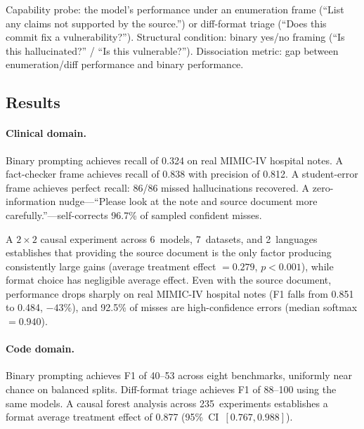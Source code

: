 \documentclass[11pt]{article}
\begin{document}
Capability probe: the model's performance under an enumeration frame
(``List any claims not supported by the source.'') or diff-format triage
(``Does this commit fix a vulnerability?''). Structural condition: binary
yes/no framing (``Is this hallucinated?'' / ``Is this vulnerable?'').
Dissociation metric: gap between enumeration/diff performance and binary
performance.

\subsection{Results}

\paragraph{Clinical domain.}
Binary prompting achieves recall of 0.324 on real MIMIC-IV hospital
notes. A fact-checker frame achieves recall of 0.838 with precision of
0.812. A student-error frame achieves perfect recall: 86/86 missed
hallucinations recovered. A zero-information nudge---``Please look at the
note and source document more carefully.''---self-corrects 96.7\% of
sampled confident misses.

A $2\times2$ causal experiment across 6~models, 7~datasets, and
2~languages establishes that providing the source document is the only
factor producing consistently large gains (average treatment effect
$= 0.279$, $p < 0.001$), while format choice has negligible average
effect. Even with the source document, performance drops sharply on real
MIMIC-IV hospital notes (F1 falls from 0.851 to 0.484, $-43$\%), and
92.5\% of misses are high-confidence errors (median softmax $= 0.940$).

\paragraph{Code domain.}
Binary prompting achieves F1 of 40--53 across eight benchmarks,
uniformly near chance on balanced splits. Diff-format triage achieves
F1 of 88--100 using the same models. A causal forest analysis across
235~experiments establishes a format average treatment effect of 0.877
(95\%~CI~$[0.767, 0.988]$).
\end{document}
